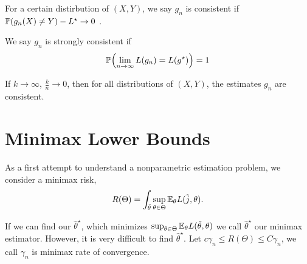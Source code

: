 \begin{defn}
  \label{defn:nearest_neighbour_classification:2}
  For a certain distirbution of $(X, Y)$, we say $g_{n}$ is consistent
  if $\Prob{g_{n}(X) \neq Y} - L^{\star} \rightarrow 0$ .

  We say $g_{n}$ is strongly consistent if
  \begin{equation}
    \label{eq:97}
    \Prob{\lim_{n \rightarrow \infty} L(g_{n}) = L(g^{\star})} = 1
  \end{equation}
\end{defn}

\begin{thm}
  \label{defn:nearest_neighbour_classification:3}
  If $k \rightarrow \infty$, $\frac{k}{n} \rightarrow 0$, then for all
  distributions of $(X, Y)$, the \knn estimates $g_{n}$ are consistent.
\end{thm}

\section{Minimax Lower Bounds}
\label{sec:minimax-lower-bounds}


\begin{defn}
  \label{sec:minimax-lower-bounds-1}
  As a first attempt to understand a nonparametric estimation problem,
  we consider a minimax risk,
  \begin{equation}
    \label{eq:105}
    R(\Theta) = \int_{\tilde \theta} \sup_{\theta \in \Theta}
    \E_{\theta} L(\tilde j, \theta).
  \end{equation}
\end{defn}

\begin{defn}
  \label{sec:minimax-lower-bounds-2}
  If we can find our $\hat \theta^{\star}$, which minimizes
  $\sup_{\theta \in \Theta} \E_{\theta} L(\tilde \theta, \theta)$ we
  call $\hat \theta^{\star}$ our minimax estimator. However, it is
  very difficult to find $\hat \theta^{\star}$. Let $c \gamma_{n} \leq
  R(\Theta) \leq C \gamma_{n}$, we call $\gamma_{n}$ is minimax rate
  of convergence.
\end{defn}

